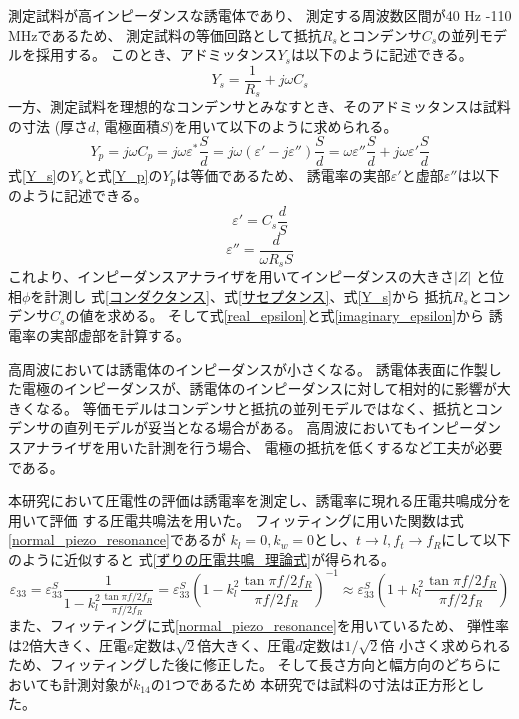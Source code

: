 \documentclass[dvipdfmx,12pt,a4paper]{jreport}
\begin{document}
			測定試料が高インピーダンスな誘電体であり、
			測定する周波数区間が40 Hz -110 MHzであるため、
			測定試料の等価回路として抵抗$R_s$とコンデンサ$C_s$の並列モデルを採用する。
			このとき、アドミッタンス$Y_s$は以下のように記述できる。
			\begin{equation}
				Y_s = \frac{1}{R_s}+j\omega C_s
				\label{Y_s}
			\end{equation}
			一方、測定試料を理想的なコンデンサとみなすとき、そのアドミッタンスは試料の寸法
			(厚さ$d$, 電極面積$S$)を用いて以下のように求められる。
			\begin{equation}
				Y_p= j \omega C_p = j \omega \varepsilon^{*} \frac{S}{d} = 
				j\omega (\varepsilon'-j\varepsilon'')\frac{S}{d} =
				\omega\varepsilon''\frac{S}{d} + j\omega \varepsilon' \frac{S}{d}
				\label{Y_p}
			\end{equation}
			式\eqref{Y_s}の$Y_s$と式\eqref{Y_p}の$Y_p$は等価であるため、
			誘電率の実部$\varepsilon'$と虚部$\varepsilon''$は以下のように記述できる。
			\begin{equation}
				\varepsilon' = C_s \frac{d}{S}
				\label{real_epsilon}
			\end{equation}
			\begin{equation}
				\varepsilon'' = \frac{d}{\omega R_s S}
				\label{imaginary_epsilon}
			\end{equation}
			これより、インピーダンスアナライザを用いてインピーダンスの大きさ$|Z|$
			と位相$\phi$を計測し
			式\eqref{コンダクタンス}、式\eqref{サセプタンス}、式\eqref{Y_s}から
			抵抗$R_s$とコンデンサ$C_s$の値を求める。
			そして式\eqref{real_epsilon}と式\eqref{imaginary_epsilon}から
			誘電率の実部虚部を計算する。
			
			高周波においては誘電体のインピーダンスが小さくなる。
			誘電体表面に作製した電極のインピーダンスが、誘電体のインピーダンスに対して相対的に影響が大きくなる。
			等価モデルはコンデンサと抵抗の並列モデルではなく、抵抗とコンデンサの直列モデルが妥当となる場合がある。
			高周波においてもインピーダンスアナライザを用いた計測を行う場合、
			電極の抵抗を低くするなど工夫が必要である。
			
			本研究において圧電性の評価は誘電率を測定し、誘電率に現れる圧電共鳴成分を用いて評価
			する圧電共鳴法を用いた。
			フィッティングに用いた関数は式\eqref{normal_piezo_resonance}であるが
			$k_l=0, k_w=0$とし、$t\rightarrow l, f_t \rightarrow f_R$にして以下のように近似すると
			式\eqref{ずりの圧電共鳴_理論式}が得られる。
			\begin{equation}
				\varepsilon_{33} =
				\varepsilon_{33}^S
				\frac{1}{1-k_l^2\frac{\tan{\pi f/2f_R}}{\pi f/2f_R}}
				= \varepsilon_{33}^S\left(1-k_l^2\frac{\tan{\pi f/2f_R}}{\pi f/2f_R}\right)^{-1}
				\approx \varepsilon_{33}^S\left(1+k_l^2\frac{\tan{\pi f/2f_R}}{\pi f/2f_R}\right)
			\end{equation}
			また、フィッティングに式\eqref{normal_piezo_resonance}を用いているため、
			弾性率は2倍大きく、圧電$e$定数は$\sqrt{2}$倍大きく、圧電$d$定数は$1/\sqrt{2}$倍
			小さく求められるため、フィッティングした後に修正した。
			そして長さ方向と幅方向のどちらにおいても計測対象が$k_{14}$の1つであるため
			本研究では試料の寸法は正方形とした。
			\newpage
\end{document}

